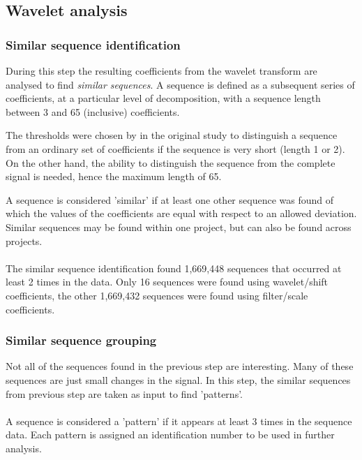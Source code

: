 \subsection{Wavelet analysis}
\subsubsection{Similar sequence identification}
During this step the resulting coefficients from the wavelet transform are
analysed to find \emph{similar sequences}\rm. A sequence is defined as a
subsequent series of coefficients, at a particular level of decomposition, with
a sequence length between 3 and 65 (inclusive) coefficients.

The thresholds were chosen by \citet{karus2013} in the original study to
distinguish a sequence from an ordinary set of coefficients if the sequence is
very short (length 1 or 2). On the other hand, the ability to distinguish the
sequence from the complete signal is needed, hence the maximum length of 65.

A sequence is considered 'similar' if at least one other sequence was found of
which the values of the coefficients are equal with respect to an allowed
deviation. Similar sequences may be found within one project, but can also be
found across projects.

\paragraph{}
The similar sequence identification found 1,669,448 sequences that occurred
at least 2 times in the data. Only 16 sequences were found using wavelet/shift
coefficients, the other 1,669,432 sequences were found using filter/scale
coefficients.

\subsubsection{Similar sequence grouping}
\label{def:pattern}
Not all of the sequences found in the previous step are interesting. Many of
these sequences are just small changes in the signal. In this step, the similar
sequences from previous step are taken as input to find 'patterns'.

\paragraph{}
A sequence is considered a 'pattern' if it appears at least 3 times in the
sequence data. Each pattern is assigned an identification number to be used in
further analysis.

